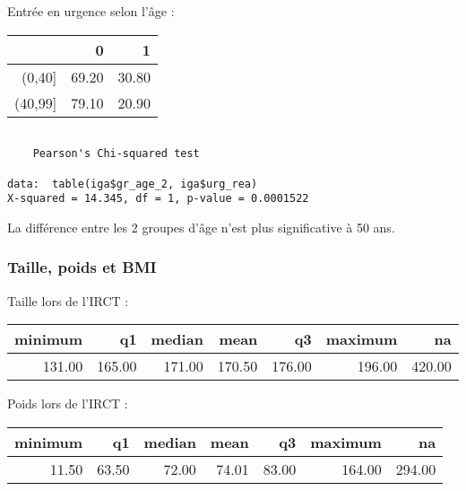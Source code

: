 \documentclass[11pt,a4paper]{article}\usepackage[]{graphicx}\usepackage[]{color}
\makeatletter
\newenvironment{kframe}{%
 \def\at@end@of@kframe{}%
 \ifinner\ifhmode%
  \def\at@end@of@kframe{\end{minipage}}%
  \begin{minipage}{\columnwidth}%
 \fi\fi%
 \def\FrameCommand##1{\hskip\@totalleftmargin \hskip-\fboxsep
 \colorbox{shadecolor}{##1}\hskip-\fboxsep
     \hskip-\linewidth \hskip-\@totalleftmargin \hskip\columnwidth}%
 \MakeFramed {\advance\hsize-\width
   \@totalleftmargin\z@ \linewidth\hsize
   \@setminipage}}%
 {\par\unskip\endMakeFramed%
 \at@end@of@kframe}
\newenvironment{knitrout}{}{} %
\makeatother
\begin{document}
Entrée en urgence selon l'âge :

\begin{table}[H]
\centering
\begin{tabular}{rrr}
  \hline
 & 0 & 1 \\ 
  \hline
(0,40] & 69.20 & 30.80 \\ 
  (40,99] & 79.10 & 20.90 \\ 
   \hline
\end{tabular}
\end{table}


\begin{knitrout}
\color{fgcolor}\begin{kframe}
\begin{verbatim}

	Pearson's Chi-squared test

data:  table(iga$gr_age_2, iga$urg_rea)
X-squared = 14.345, df = 1, p-value = 0.0001522
\end{verbatim}
\end{kframe}
\end{knitrout}

La différence entre les 2 groupes d'âge n'est plus significative à 50 ans.

    \subsubsection{Taille, poids et BMI}
  
Taille lors de l'IRCT :
  
\begin{table}[ht]
\centering
\begin{tabular}{rrrrrrr}
  \hline
minimum & q1 & median & mean & q3 & maximum & na \\ 
  \hline
131.00 & 165.00 & 171.00 & 170.50 & 176.00 & 196.00 & 420.00 \\ 
   \hline
\end{tabular}
\end{table}


Poids lors de l'IRCT :

\begin{table}[ht]
\centering
\begin{tabular}{rrrrrrr}
  \hline
minimum & q1 & median & mean & q3 & maximum & na \\ 
  \hline
11.50 & 63.50 & 72.00 & 74.01 & 83.00 & 164.00 & 294.00 \\ 
   \hline
\end{tabular}
\end{table}
\end{document}
